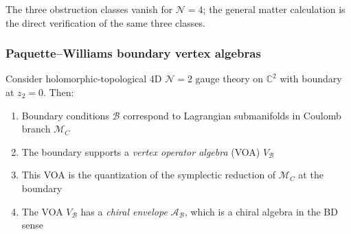 \begin{remark}
The three obstruction classes vanish for $\mathcal{N}=4$; the general
matter calculation is the direct verification of the same three classes.
\end{remark}

\subsubsection{Paquette--Williams boundary vertex algebras}

\begin{theorem}\label{thm:paquette-williams-boundaries}
\cite{PW22} Consider holomorphic-topological 4D $\mathcal{N}=2$ gauge theory on
$\mathbb{C}^2$ with boundary at $z_2 = 0$. Then:
\begin{enumerate}
\item Boundary conditions $\mathcal{B}$ correspond to Lagrangian submanifolds in
 Coulomb branch $\mathcal{M}_C$

\item The boundary supports a \emph{vertex operator algebra} (VOA) $V_{\mathcal{B}}$

\item This VOA is the quantization of the symplectic reduction of $\mathcal{M}_C$
 at the boundary

\item The VOA $V_{\mathcal{B}}$ has a \emph{chiral envelope} $\mathcal{A}_{\mathcal{B}}$,
 which is a chiral algebra in the BD sense
\end{enumerate}
\end{theorem}

